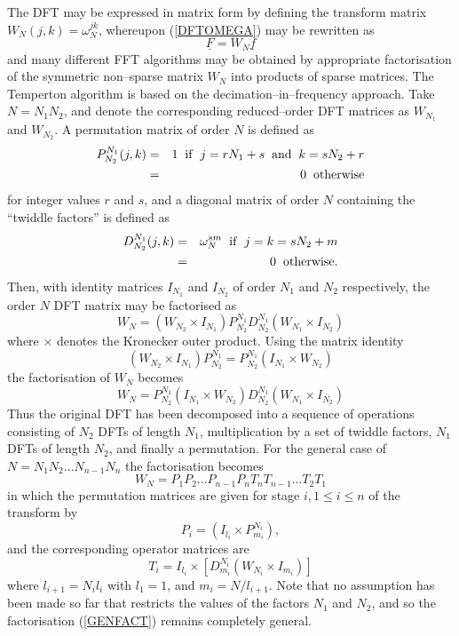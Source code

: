 \documentclass[dvips]{article}
\begin{document}
The DFT may be expressed in
matrix form by defining the transform matrix $W_{N}(j,k) = \omega_{N}^{jk}$,
whereupon (\ref{DFTOMEGA}) may be rewritten as
\[
\underline{F} = W_{N}\underline{f}
\]
and many different FFT algorithms may be obtained by appropriate
factorisation of the symmetric non--sparse matrix $W_{N}$ into products of
sparse matrices.  The Temperton algorithm is based on the 
decimation--in--frequency approach.  Take $N = N_{1}N_{2}$,
and denote the corresponding reduced--order DFT matrices as
$W_{N_{1}}$ and $W_{N_{2}}$.  A permutation matrix of order $N$ is
defined as
\begin{eqnarray} 
P_{N_{2}}^{N_{1}}(j,k) & = & 1\hspace{2mm}{\rm if}\hspace{2mm}j=rN_{1}+s
\hspace{2mm}{\rm and}\hspace{2mm}k=sN_{2}+r \nonumber\\
& = & 0\hspace{2mm}{\rm otherwise}
\end{eqnarray} 
for integer values $r$ and $s$, and a diagonal matrix of order $N$
containing the ``twiddle factors'' is defined as
\begin{eqnarray} 
D_{N_{2}}^{N_{1}}(j,k) & = & \omega_{N}^{sm}
\hspace{2mm}{\rm if}\hspace{2mm}j=k=sN_{2}+m\nonumber\\
& = & 0\hspace{2mm}{\rm otherwise.}
\end{eqnarray} 
Then, with identity matrices $I_{N_{1}}$ and $I_{N_{2}}$ of order
$N_{1}$ and $N_{2}$ respectively, the order $N$ 
DFT matrix may be factorised as
\[
W_{N} = \left(W_{N_{2}}\times I_{N_{1}}\right)
P_{N_{2}}^{N_{1}}D_{N_{2}}^{N_{1}}
\left(W_{N_{1}}\times I_{N_{2}}\right)
\]
where $\times$ denotes the Kronecker outer product.
Using the matrix identity
\[
\left(W_{N_{2}}\times I_{N_{1}}\right)P_{N_{2}}^{N_{1}}
= P_{N_{2}}^{N_{1}}\left(I_{N_{1}}\times W_{N_{2}}\right)
\]
the factorisation of $W_{N}$ becomes 
\[
W_{N} = P_{N_{2}}^{N_{1}}
\left(I_{N_{1}}\times W_{N_{2}}\right)
D_{N_{2}}^{N_{1}}
\left(W_{N_{1}}\times I_{N_{2}}\right)
\]
Thus the original DFT has been
decomposed into a sequence of operations consisting of $N_{2}$ DFTs of
length $N_{1}$, multiplication by a set of twiddle factors,
$N_{1}$ DFTs of length $N_{2}$, and finally a permutation.
For the general case of $N=N_{1}N_{2}\ldots N_{n-1}N_{n}$ the factorisation 
becomes
\begin{equation}
W_{N} = P_{1}P_{2}\ldots P_{n-1}P_{n}T_{n}T_{n-1}\ldots T_{2}T_{1}
\label{GENFACT}
\end{equation}
in which the permutation matrices are given for stage $i, 1 \leq i \leq n$
of the transform by
\[
P_{i} = \left(I_{l_{i}}\times P_{m_{i}}^{N_{i}} \right),
\]
and the corresponding operator matrices are
\[
T_{i} = I_{l_{i}}\times\left[D_{m_{i}}^{N_{i}}
\left(W_{N_{i}}\times I_{m_{i}}\right)\right]
\]
where $l_{i+1} = N_{i}l_{i}$ with $l_{1} = 1$, and $m_{i} = N/l_{i+1}$.
Note that no assumption has been made so far that restricts the values
of the factors $N_{1}$ and $N_{2}$, and so the factorisation
(\ref{GENFACT}) remains completely general.
\end{document}
